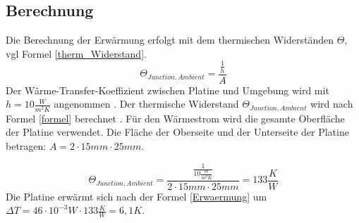 \documentclass[10pt,a4paper,oneside,abstracton]{scrartcl}
\begin{document}
\begin{multicols}{2}
\subsection{Berechnung }

\noindent
Die Berechnung der Erwärmung erfolgt mit dem thermischen Widerständen $\Theta$, vgl Formel \ref*{therm_Widerstand}.
\begin{equation}
	\Theta_{Junction, Ambient} = \frac{\frac{1}{h}}{A}
	\label{therm_Widerstand}
\end{equation}
Der Wärme-Transfer-Koeffizient zwischen Platine und Umgebung 
wird mit $ h = 10 \frac{W}{m^2K}$ angenommen \cite{TI_Thermal} .\newline
Der thermische Widerstand $\Theta_{Junction, Ambient}$  wird nach Formel \ref*{formel} berechnet . 
\newline
Für den Wärmestrom wird die gesamte Oberfläche der Platine verwendet. 
Die Fläche der Oberseite und der Unterseite der Platine betragen: \newline
$A = 2\cdot 15mm \cdot 25mm$. 

\begin{equation}
	\Theta_{Junction, Ambient} = \frac{\frac{1}{10 \frac{W}{m^2K}}}{ 2\cdot 15mm \cdot 25mm} = 133 \frac{K}{W}
	\label{formel}
\end{equation}
Die Platine erwärmt sich nach der Formel \ref{Erwaermung} um \newline
$\Delta T = 46 \cdot 10^{-3} W \cdot 133 \frac{K }{W} = 6,1 K  $.


\end{multicols}
\end{document}
